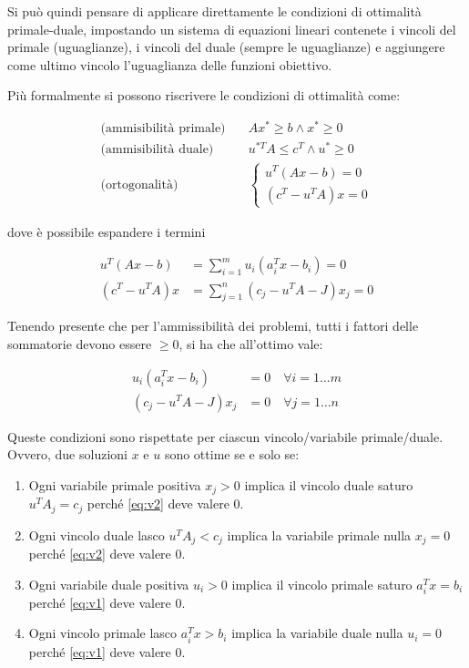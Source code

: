Si può quindi pensare di applicare direttamente le condizioni di ottimalità primale-duale, impostando un sistema di equazioni lineari contenete i vincoli del primale (uguaglianze), i vincoli del duale (sempre le uguaglianze) e aggiungere come ultimo vincolo l'uguaglianza delle funzioni obiettivo.

Più formalmente si possono riscrivere le condizioni di ottimalità come:

\begin{align*}
	\text{(ammisibilità primale)}\quad&Ax^* \geq b \wedge x^* \geq 0 \\
	\text{(ammisibilità duale)}\quad&u^{*T}A \leq c^T \wedge u^* \geq 0 \\
	\text{(ortogonalità)}\quad&\begin{cases}
	u^T(Ax -b) = 0 \\
	(c^T - u^T A) x = 0
	\end{cases}
\end{align*}

dove è possibile espandere i termini

\begin{align*}
	u^T(Ax -b) &= \sum\limits_{i=1}^{m} u_i (a_{i}^Tx -b_i) = 0\\
	(c^T - u^T A) x &=\sum\limits_{j=1}^{n} (c_j - u^TA-J)x_j = 0
\end{align*}

Tenendo presente che per l'ammissibilità dei problemi, tutti i fattori delle sommatorie devono essere $\geq 0$, si ha che all'ottimo vale:

\begin{align}
u_i (a_{i}^Tx -b_i) &= 0 \quad \forall i = 1 \ldots m \label{eq:v1}	\\
(c_j - u^TA-J)x_j   &= 0\quad \forall j = 1 \ldots n \label{eq:v2}
\end{align}

Queste condizioni sono rispettate per ciascun vincolo/variabile primale/duale.
Ovvero, due soluzioni $x$ e $u$ sono ottime se e solo se:

\begin{enumerate}
	\item Ogni variabile primale positiva $x_j > 0$ implica il vincolo duale saturo $u^TA_j = c_j$ perché \ref{eq:v2} deve valere 0.
	\item Ogni vincolo duale lasco $u^TA_j < c_j$ implica la variabile primale nulla $x_j = 0$ perché \ref{eq:v2} deve valere 0.
	\item Ogni variabile duale positiva $u_i > 0$ implica il vincolo primale saturo $a_{i}^Tx = b_i$ perché \ref{eq:v1} deve valere 0.
	\item Ogni vincolo primale lasco $a_{i}^Tx > b_i$ implica la variabile duale nulla $u_i = 0$ perché \ref{eq:v1} deve valere 0.
\end{enumerate}

